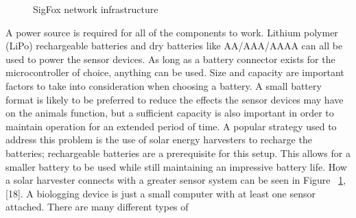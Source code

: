\documentclass[sigplan,screen,nonacm]{acmart}
\begin{document}
\begin{figure}[htbp]
  \centering
  \caption{SigFox network infrastructure\cite{wild2023internet}}
  \label{fig:WildFi_microcontroller}
\end{figure}
A power source is required for all of the components to work. Lithium polymer (LiPo) rechargeable batteries and 
dry batteries like AA/AAA/AAAA can all be used to power the sensor devices. As long as a battery connector exists 
for the microcontroller of choice, anything can be used. Size and capacity are important factors to take into 
consideration when choosing a battery. A small battery format is likely to be preferred to reduce the effects the 
sensor devices may have on the animals function, but a sufficient capacity is also important in order to maintain 
operation for an extended period of time. A popular strategy used to address this problem is the use of solar 
energy harvesters to recharge the batteries; rechargeable batteries are a prerequisite for this setup. This allows 
for a smaller battery to be used while still maintaining an impressive battery life. How a solar harvester connects 
with a greater sensor system can be seen in Figure ~\ref{fig:WildFi_microcontroller}, [18].
A biologging device is just a small computer with at least one sensor attached. There are many different types of 
\end{document}
